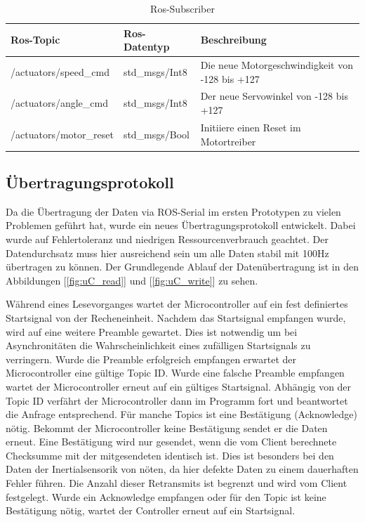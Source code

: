 \begin{table}[H]
  \centering
  \begin{tabularx}{\textwidth}{|X|l|X|}
    \hline
     Ros-Topic 			& Ros-Datentyp		 	& Beschreibung 	\\ \hline \hline
    /actuators/speed\_cmd		& std\_msgs/Int8		& Die neue Motorgeschwindigkeit von -128 bis +127		\\ \hline
    /actuators/angle\_cmd		& std\_msgs/Int8		& Der neue Servowinkel von -128 bis +127			\\ \hline
    /actuators/motor\_reset		& std\_msgs/Bool		& Initiiere einen Reset im Motortreiber				\\ \hline
  \end{tabularx}
  \caption{Ros-Subscriber}%
  \label{tab:ros-sub}
\end{table}



\subsection{Übertragungsprotokoll}
Da die Übertragung der Daten via ROS-Serial im ersten Prototypen zu vielen Problemen geführt hat, wurde ein neues Übertragungsprotokoll entwickelt.
Dabei wurde auf Fehlertoleranz und niedrigen Ressourcenverbrauch geachtet. Der Datendurchsatz muss hier ausreichend sein um alle Daten stabil mit 100Hz
übertragen zu können.
Der Grundlegende Ablauf der Datenübertragung ist in den Abbildungen [\ref{fig:uC_read}] und [\ref{fig:uC_write}] zu sehen.


Während eines Lesevorganges wartet der Microcontroller auf ein fest definiertes Startsignal von der Recheneinheit. Nachdem das Startsignal empfangen wurde, wird auf eine weitere Preamble gewartet.
Dies ist notwendig um bei Asynchronitäten die Wahrscheinlichkeit eines zufälligen Startsignals zu verringern. Wurde die Preamble erfolgreich empfangen erwartet der Microcontroller eine gültige Topic ID.
Wurde eine falsche Preamble empfangen wartet der Microcontroller erneut auf ein gültiges Startsignal. Abhängig von der Topic ID verfährt der Microcontroller dann im Programm fort und beantwortet
die Anfrage entsprechend. Für manche Topics ist eine Bestätigung (Acknowledge) nötig. Bekommt der Microcontroller keine Bestätigung sendet er die Daten erneut. Eine Bestätigung wird nur gesendet,
wenn die vom Client berechnete Checksumme mit der mitgesendeten identisch ist. Dies ist besonders bei den Daten der Inertialsensorik von nöten, da hier defekte Daten zu einem dauerhaften Fehler führen. 
Die Anzahl dieser Retransmits ist begrenzt und wird vom Client festgelegt. Wurde ein Acknowledge empfangen oder für den Topic ist keine Bestätigung
nötig, wartet der Controller erneut auf ein Startsignal.

